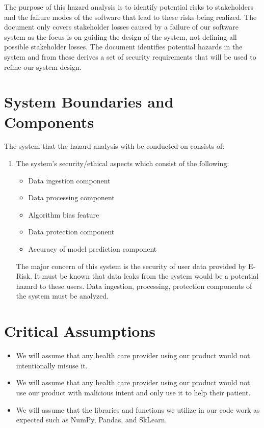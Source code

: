 \documentclass{article}
\begin{document}
The purpose of this hazard analysis is to identify potential risks to stakeholders and the failure modes of the software that lead to these risks being realized. The document only covers stakeholder losses caused by a failure of our software system as the focus is on guiding the design of the system, not defining all possible stakeholder losses. The document identifies potential hazards in the system and from these derives a set of security requirements that will be used to refine our system design.

\section{System Boundaries and Components}

The system that the hazard analysis with be conducted on consists of:
\begin{enumerate}
	\item The system's security/ethical aspects which consist of the following:
	      \begin{itemize}
		      \item Data ingestion component
		      \item Data processing component
		      \item Algorithm bias feature
		      \item Data protection component
		      \item Accuracy of model prediction component
	      \end{itemize}
	The major concern of this system is the security of user data provided by E-Risk. It must be known that data leaks from the system would be a potential hazard to these users. Data ingestion, processing, protection components of the system must be analyzed. 
\end{enumerate}

\section{Critical Assumptions}

\begin{itemize}
    \item We will assume that any health care provider using our product would not intentionally misuse it.
    \item We will assume that any health care provider using our product would not use our product with malicious intent and only use it to help their patient.
    \item We will assume that the libraries and functions we utilize in our code work as expected such as NumPy, Pandas, and SkLearn.
  \end{itemize}
\end{document}
